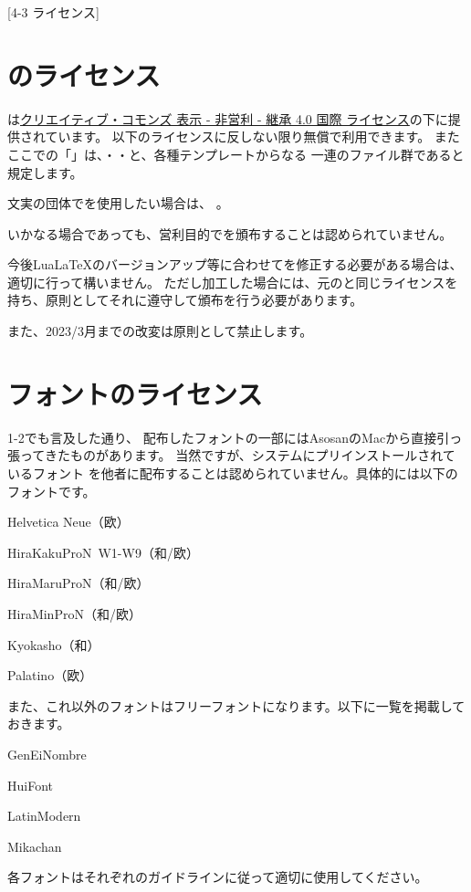 \newpage
\pagestyle{leaflet}
[4-3 ライセンス]
\begin{multicols*}{2}
\section{\BunTeX のライセンス}
\BunTeX は\href{https://creativecommons.org/licenses/by-nc-sa/4.0/}{クリエイティブ・コモンズ 表示 - 非営利 - 継承 4.0 国際 ライセンス}の下に提供されています。
以下のライセンスに反しない限り無償で利用できます。
またここでの「\BunTeX 」は、{\BunTeXB}・{\BunTeXC}・{\BunTeXD}と、各種テンプレートからなる
一連のファイル群であると規定します。

文実の団体で\BunTeX を使用したい場合は、
。

いかなる場合であっても、営利目的で\BunTeX を頒布することは認められていません。

今後Lua\LaTeX のバージョンアップ等に合わせて\BunTeX を修正する必要がある場合は、
適切に行って構いません。
ただし加工した場合には、元の\BunTeX と同じライセンスを持ち、原則としてそれに遵守して頒布を行う必要があります。

また、2023/3月までの改変は原則として禁止します。


\section{フォントのライセンス}
1-2でも言及した通り、
配布したフォントの一部にはAsosanのMacから直接引っ張ってきたものがあります。
当然ですが、システムにプリインストールされているフォント
を他者に配布することは認められていません。具体的には以下のフォントです。
\begin{reitemize}
    \item Helvetica Neue（欧）
    \item HiraKakuProN~W1-W9（和/欧）
    \item HiraMaruProN（和/欧）
    \item HiraMinProN（和/欧）
    \item Kyokasho（和）
    \item Palatino（欧）
\end{reitemize}

また、これ以外のフォントはフリーフォントになります。以下に一覧を掲載しておきます。
\begin{reitemize}
    \item GenEiNombre
    \item HuiFont
    \item LatinModern
    \item Mikachan
\end{reitemize}
各フォントはそれぞれのガイドラインに従って適切に使用してください。

\end{multicols*}